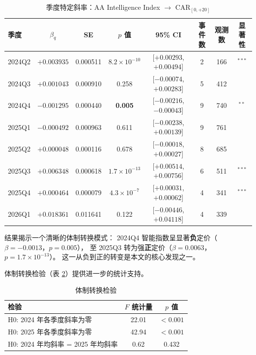 \documentclass[11pt,fontset=fandol,a4paper]{ctexart}
\begin{document}
\begin{table}[htbp]
\centering
\caption{季度特定斜率：AA Intelligence Index $\rightarrow$ $\text{CAR}_{[0,+20]}$}
\label{tab:quarter_slopes}
\small
\begin{tabular}{lccccccc}
\toprule
季度 & $\beta_q$ & SE & $p$ 值 & 95\% CI & 事件数 & 观测数 & 显著性 \\
\midrule
2024Q2 & $+0.003935$ & 0.000511 & $8.2\times10^{-10}$ & [$+0.00293$, $+0.00494$] & 2  & 166 & $^{***}$ \\
2024Q3 & $+0.001043$ & 0.000910 & 0.258 & [$-0.00074$, $+0.00283$] & 5  & 412 & \\
2024Q4 & \textbf{$-0.001295$} & 0.000440 & \textbf{0.005} & [$-0.00216$, $-0.00043$] & 9  & 740 & $^{**}$ \\
2025Q1 & $-0.000492$ & 0.000963 & 0.611 & [$-0.00238$, $+0.00139$] & 9  & 761 & \\
2025Q2 & $+0.000048$ & 0.000116 & 0.678 & [$-0.00018$, $+0.00027$] & 8  & 685 & \\
2025Q3 & \textbf{$+0.006348$} & 0.000618 & \textbf{$1.7\times10^{-13}$} & [$+0.00514$, $+0.00756$] & 6  & 511 & $^{***}$ \\
2025Q4 & $+0.000464$ & 0.000079 & $4.3\times10^{-7}$ & [$+0.00031$, $+0.00062$] & 4  & 341 & $^{***}$ \\
2026Q1 & $+0.018361$ & 0.011641 & 0.122 & [$-0.00446$, $+0.04118$] & 4  & 339 & \\
\bottomrule
\end{tabular}
\end{table}

结果揭示一个清晰的体制转换模式：
2024Q4 智能指数呈显著\textbf{负}定价（$\beta=-0.0013$，$p=0.005$），
至 2025Q3 转为强\textbf{正}定价（$\beta=0.0063$，$p=1.7\times10^{-13}$）。
这一从负到正的转变是本文的核心发现之一。

体制转换检验（表 \ref{tab:regime_tests}）提供进一步的统计支持。

\begin{table}[htbp]
\centering
\caption{体制转换检验}
\label{tab:regime_tests}
\small
\begin{tabular}{lcc}
\toprule
检验 & $F$ 统计量 & $p$ 值 \\
\midrule
H0: 2024 年各季度斜率为零        & 22.01 & $<0.001$ \\
H0: 2025 年各季度斜率为零        & 42.94 & $<0.001$ \\
H0: 2024 年均斜率 = 2025 年均斜率 & 0.62  & 0.432 \\
\bottomrule
\end{tabular}
\end{table}
\end{document}
